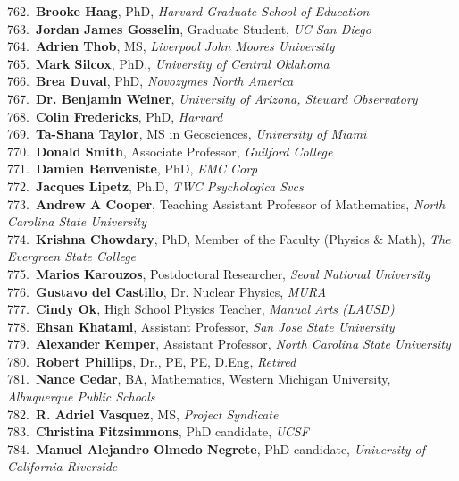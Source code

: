 762.~{\bf Brooke Haag}, PhD, {\sl Harvard Graduate School of Education} \\
763.~{\bf Jordan James Gosselin}, Graduate Student, {\sl UC San Diego} \\
764.~{\bf Adrien Thob}, MS, {\sl Liverpool John Moores University} \\
765.~{\bf Mark Silcox}, PhD., {\sl University of Central Oklahoma} \\
766.~{\bf Brea Duval}, PhD, {\sl Novozymes North America} \\
767.~{\bf Dr. Benjamin Weiner}, {\sl University of Arizona, Steward Observatory} \\
768.~{\bf Colin Fredericks}, PhD, {\sl Harvard} \\
769.~{\bf Ta-Shana Taylor}, MS in Geosciences, {\sl University of Miami} \\
770.~{\bf Donald Smith}, Associate Professor, {\sl Guilford College} \\
771.~{\bf Damien Benveniste}, PhD, {\sl EMC Corp} \\
772.~{\bf Jacques Lipetz}, Ph.D, {\sl TWC Psychologica Svcs} \\
773.~{\bf Andrew A Cooper}, Teaching Assistant Professor of Mathematics, {\sl North Carolina State University} \\
774.~{\bf Krishna Chowdary}, PhD, Member of the Faculty (Physics \& Math), {\sl The Evergreen State College} \\
775.~{\bf Marios Karouzos}, Postdoctoral Researcher, {\sl Seoul National University} \\
776.~{\bf Gustavo del Castillo}, Dr. Nuclear Physics, {\sl MURA} \\
777.~{\bf Cindy Ok}, High School Physics Teacher, {\sl Manual Arts (LAUSD)} \\
778.~{\bf Ehsan Khatami}, Assistant Professor, {\sl San Jose State University} \\
779.~{\bf Alexander Kemper}, Assistant Professor, {\sl North Carolina State University} \\
780.~{\bf Robert Phillips}, Dr., PE, PE, D.Eng, {\sl Retired} \\
781.~{\bf Nance Cedar}, BA, Mathematics, Western Michigan University, {\sl Albuquerque Public Schools} \\
782.~{\bf R. Adriel Vasquez}, MS, {\sl Project Syndicate} \\
783.~{\bf Christina Fitzsimmons}, PhD candidate, {\sl UCSF} \\
784.~{\bf Manuel Alejandro Olmedo Negrete}, PhD candidate, {\sl University of California Riverside } \\
